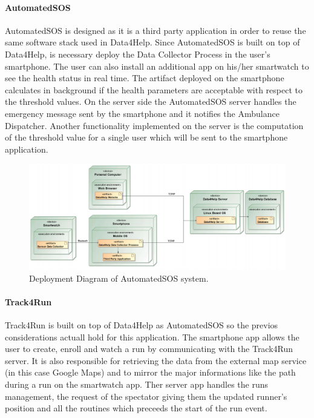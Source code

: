 \documentclass[a4paper]{article}
\begin{document}
\paragraph{AutomatedSOS}
AutomatedSOS is designed as it is a third party application in order to reuse the same software stack used in Data4Help. Since AutomatedSOS is built on top of Data4Help, is necessary deploy the Data Collector Process in the user's smartphone. The user can also install an additional app on his/her smartwatch to see the health status in real time. The artifact deployed on the smartphone calculates in background if the health parameters are acceptable with respect to the threshold values. On the server side the AutomatedSOS server handles the emergency message sent by the smartphone and it notifies the Ambulance Dispatcher. Another functionality implemented on the server is the computation of the threshold value for a single user which will be sent to the smartphone application.

\begin{figure}[H]
    \centering
    \includegraphics[width=\linewidth]{deploymentDiagram-AutomatedSOS}
    \caption{Deployment Diagram of AutomatedSOS system.}
    \label{fig:my_label}
\end{figure}

\paragraph{Track4Run}
Track4Run is built on top of Data4Help as AutomatedSOS so the previos considerations actuall hold for this application. The smartphone app allows the user to create, enroll and watch a run by communicating with the Track4Run server. It is also responsible for retrieving the data from the external map service (in this case Google Maps) and to mirror the major informations like the path during a run on the smartwatch app. Ther server app handles the runs management, the request of the spectator giving them the updated runner's position and all the routines which preceeds the start of the run event.
\end{document}
